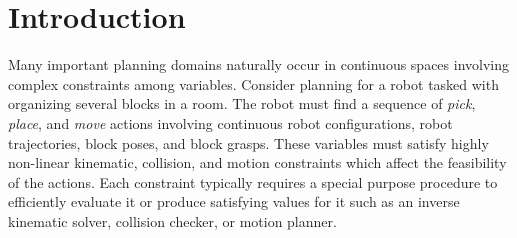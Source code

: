 \documentclass[letterpaper]{article} %
\theoremstyle{plain}\newtheorem{thm}{Theorem}
\theoremstyle{definition}\newtheorem{defn}{Definition}
\theoremstyle{plain}\newtheorem{lem}{Lemma}
\theoremstyle{plain}\newtheorem{cor}{Corollary}
\newcommand{\strips}{{\sc strips}}
\newcommand{\pddl}{{\sc pddl}}
\begin{document}

\section{Introduction}

Many important planning domains naturally occur in continuous spaces involving
complex constraints among variables. Consider planning for a robot tasked with
organizing several blocks in a room. 
The robot must find a sequence of {\em pick}, {\em place}, and {\em move} actions
involving continuous robot configurations, robot trajectories, block poses, and block grasps.
These variables must satisfy highly non-linear kinematic, collision, and motion constraints 
which affect the feasibility of the actions. 
Each constraint typically requires a special purpose procedure to efficiently evaluate it or produce satisfying values for it such as an inverse kinematic solver, collision checker, or motion planner. 

\end{document}
